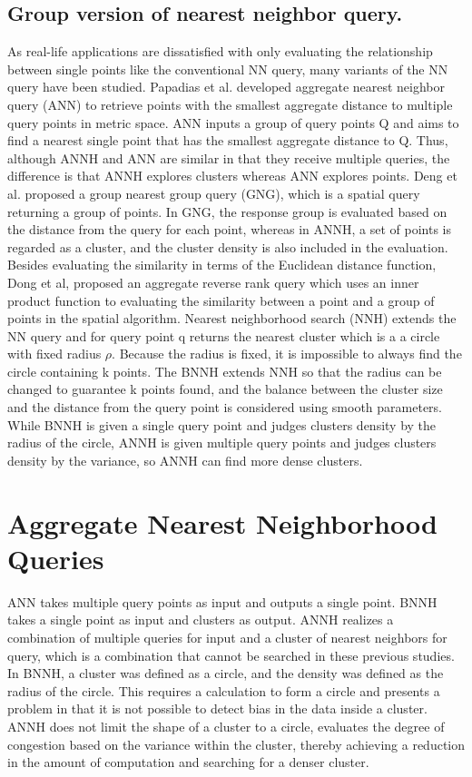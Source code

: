 \documentclass[a4paper,11pt]{report}
\theoremstyle{mytheoremstyle}
\begin{document}
\section{Group version of nearest neighbor query.}
As real-life applications are dissatisfied with only evaluating the relationship between single points like the conventional NN query, many variants of the NN query have been studied. Papadias et al. developed aggregate nearest neighbor query (ANN) \cite{ANN} to retrieve points with the smallest aggregate distance to multiple query points in metric space. ANN inputs a group of query points Q and aims to find a nearest single point that has the smallest aggregate distance to Q. Thus, although ANNH and ANN are similar in that they receive multiple queries, the difference is that ANNH explores clusters whereas ANN explores points. Deng et al. \cite{GNG} proposed a group nearest group query (GNG), which is a spatial query returning a group of points. In GNG, the response group is evaluated based on the distance from the query for each point, whereas in ANNH, a set of points is regarded as a cluster, and the cluster density is also included in the evaluation. Besides evaluating the similarity in terms of the Euclidean distance function, Dong et al, \cite{dong2017grid} proposed an aggregate reverse rank query which uses an inner product function to evaluating the similarity between a point and a group of points in the spatial algorithm. Nearest neighborhood search (NNH) \cite{NNH} extends the NN query and for query point q returns the nearest cluster which is a a circle with fixed radius $\rho$. Because the radius is fixed, it is impossible to
always find the circle containing k points. The BNNH \cite{BNNH} extends NNH so that the radius can be changed to guarantee k points found, and the balance between the cluster size and the distance from the query point is considered using smooth parameters. While BNNH is given a single query point and judges clusters density by the radius of the circle, ANNH is given multiple query points and judges clusters density by the variance, so ANNH can find more dense clusters.

\chapter{Aggregate Nearest Neighborhood Queries}
\label{section:annh}
ANN \cite {ANN} takes multiple query points as input and outputs a single point. BNNH \cite{BNNH} takes a single point as input and clusters as output. ANNH realizes a combination of multiple queries for input and a cluster of nearest neighbors for query, which is a combination that cannot be searched in these previous studies.
In BNNH, a cluster was defined as a circle, and the density was defined as the radius of the circle. This requires a calculation to form a circle and presents a problem in that it is not possible to detect bias in the data inside a cluster. ANNH does not limit the shape of a cluster to a circle, evaluates the degree of congestion based on the variance within the cluster, thereby achieving a reduction in the amount of computation and searching for a denser cluster.
\end{document}
